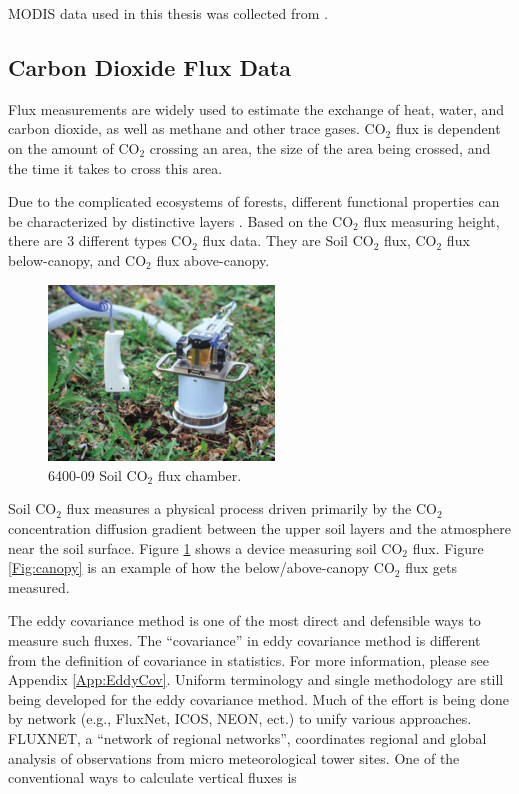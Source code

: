 \documentclass{article}
\newcommand{\MYhref}[3][blue]{\href{#2}{\color{#1}{#3}}}%
\begin{document}
MODIS data used in this thesis was collected from \MYhref[black]{http://daac.ornl.gov/MODIS/}{the Oak Ridge National Laboratory Distributed Active Archive Center (ORNL DAAC) MODIS land product subsets}.

\subsection{Carbon Dioxide Flux Data}\label{SubSec:FluxData}

Flux measurements are widely used to estimate the exchange of heat, water, and carbon dioxide, as well as methane and other trace gases. CO$_2$ flux is dependent on the amount of CO$_2$ crossing an area, the size of the area being crossed, and the time it takes to cross this area.

Due to the complicated ecosystems of forests, different functional properties can be characterized by distinctive layers \citep{misson2007partitioning}.
Based on the CO$_2$ flux measuring height, there are 3 different types CO$_2$ flux data. They are Soil CO$_2$ flux, CO$_2$ flux below-canopy, and CO$_2$ flux above-canopy.

\begin{figure}[!ht]
\centering
\includegraphics[width=6cm]{soilflux.png}
\caption{6400-09 Soil CO$_2$ flux chamber.}
\label{Fig:soilflux}
\end{figure}

Soil CO$_2$ flux measures a physical process driven primarily by the CO$_2$ concentration diffusion gradient between the upper soil layers and the atmosphere near the soil surface. Figure \ref{Fig:soilflux} shows a device measuring soil CO$_2$ flux. Figure \ref{Fig:canopy} is an example of how the below/above-canopy CO$_2$ flux gets measured.

The eddy covariance method is one of the most direct and defensible ways to measure such fluxes. The ``covariance'' in eddy covariance method is different from the definition of covariance in statistics. For more information, please see Appendix \ref{App:EddyCov}. Uniform terminology and single methodology are still being developed for the eddy covariance method.  Much of the effort is being done by network (e.g., FluxNet, ICOS, NEON, ect.)  to unify various approaches. FLUXNET, a ``network of regional networks'', coordinates regional and global analysis of observations from micro meteorological tower sites. One of the conventional ways to calculate vertical fluxes is
\end{document}
